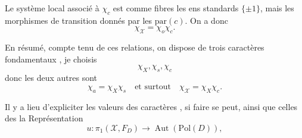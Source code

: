  Le système local associé à $\chi_c$ est  comme fibres les ens standards $\{\pm1\}$, mais les morphismes de transition donnés par les $\mathrm{par}(c)$. On a donc
\[
\boxed{\chi_{\mathscr X}=\chi_o\chi_c}.
\]

En résumé, compte tenu de ces relations, on dispose de trois caractères fondamentaux , je choisis
\[
\chi_X,\chi_s,\chi_c
\]
donc les deux autres sont
\[
\chi_a=\chi_X\chi_s\quad\text{et surtout}\quad\chi_{\mathscr X}=\chi_X\chi_c.
\]

Il y a lieu d'expliciter les valeurs des caractères , si faire se peut, ainsi que celles des la Représentation
\[
u:\pi_1(\mathscr X,F_D)\longrightarrow\operatorname{Aut}(\mathrm{Pol}(D)),
\]
